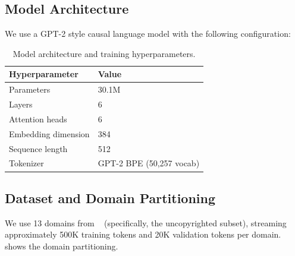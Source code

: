 \subsection{Model Architecture}

We use a GPT-2 style causal language model with the following configuration:

\begin{table}[t]
\centering
\caption{Model architecture and training hyperparameters.}
\begin{tabular}{@{}ll@{}}
\toprule
\textbf{Hyperparameter} & \textbf{Value} \\
\midrule
Parameters & 30.1M \\
Layers & 6 \\
Attention heads & 6 \\
Embedding dimension & 384 \\
Sequence length & 512 \\
Tokenizer & GPT-2 BPE (50{,}257 vocab) \\
\bottomrule
\end{tabular}
\label{tab:architecture}
\end{table}

\subsection{Dataset and Domain Partitioning}
\label{sec:data}

We use 13 domains from \thepile~\cite{gao2020pile} (specifically, the uncopyrighted subset), streaming approximately 500K training tokens and 20K validation tokens per domain.  shows the domain partitioning.

\begin{table}[t]
\centering
\caption{Domain partitioning into core (always available), shift (withheld then introduced), and held-out (never trained on) groups.}
\label{tab:domains}
\end{table}


